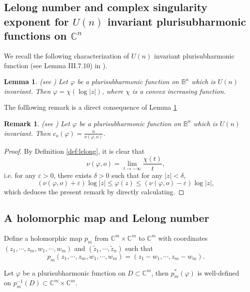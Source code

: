 \documentclass[reqno]{amsart}
\newtheorem{Lemma}[Theorem]{Lemma}
\newtheorem{Remark}[Theorem]{Remark}
\numberwithin{equation}{section}
\begin{document}
\subsection{Lelong number and complex singularity exponent for $U(n)$ invariant plurisubharmonic functions on $\mathbb{C}^{n}$}

We recall the following characterization of
 $U(n)$ invariant plurisubharmonic function (see Lemma III.7.10) in \cite{demailly-book}).

\begin{Lemma}
\label{lem:chara_invar}(see \cite{demailly-book})
Let $\varphi$ be a plurisubharmonic function on $\mathbb{B}^{n}$
which is $U(n)$ invariant.
Then
$\varphi=\chi(\log|z|)$,
where $\chi$ is a convex increasing function.
\end{Lemma}

The folllowing remark is a direct consequence of Lemma \ref{lem:chara_invar}

\begin{Remark}
\label{rem:lct_lelong_u(n)}(see \cite{demailly-book})
Let $\varphi$ be a plurisubharmonic function on $\mathbb{B}^{n}$
which is $U(n)$ invariant.
Then
$c_{o}(\varphi)=\frac{n}{\nu(\varphi,o)}$.
\end{Remark}

\begin{proof}
By Definition \ref{def:lelong},
it is clear that
$$\nu(\varphi,o)=\lim_{t\to-\infty}\frac{\chi(t)}{t},$$
i.e.
for any $\varepsilon>0$,
there exists $\delta>0$
such that for any $|z|<\delta$,
$$(\nu(\varphi,o)+\varepsilon)\log|z|\leq\varphi(z)\leq(\nu(\varphi,o)-\varepsilon)\log|z|,$$
which deduces the present remark by directly calculating.
\end{proof}

\subsection{A holomorphic map and Lelong number}

Define a holomorphic map $p_{m}$ from $\mathbb{C}^{m}\times\mathbb{C}^{m}$ to $\mathbb{C}^{m}$
with coordinates $(z_{1},\cdots,z_{m},w_{1},\cdots,w_{m})$ and $(\tilde{z}_{1},\cdots,\tilde{z}_{n})$
such that
$$p_{m}(z_{1},\cdots,z_{m},w_{1},\cdots,w_{m})=(z_{1}-w_{1},\cdots,z_{m}-w_{m}).$$

Let $\varphi$ be a plurisubharmonic function on $D\subset\mathbb{C}^{m}$,
then $p_{m}^{*}(\varphi)$ is well-defined on $p_{m}^{-1}(D)\subset\mathbb{C}^{m}\times\mathbb{C}^{m}$.
\end{document}
